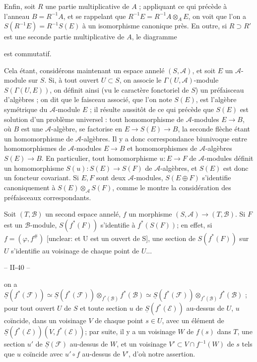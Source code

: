 Enfin, soit $R$ une partie multiplicative de $A$ ; appliquant ce qui précède à l'anneau $B=R^{-1}A$, et se rappelant que $R^{-1}E = R^{-1}A \otimes_A E$, on voit que l'on a $S(R^{-1}E) = R^{-1}S(E)$ à un isomorphisme canonique près. En outre, si $R \supset R'$ est une seconde partie multiplicative de $A$, le diagramme


est commutatif.

Cela étant, considérons maintenant un espace annelé $(S, \mathcal{A})$, et soit $E$ un $\mathcal{A}$-module sur $S$. Si, à tout ouvert $U \subset S$, on associe le $\Gamma(U, \mathcal{A})$-module $S(\Gamma(U, E))$, on définit ainsi (vu le caractère fonctoriel de $S$) un préfaisceau d'algèbres ; on dit que le faisceau associé, que l'on note $S(E)$, est l'algèbre symétrique du $\mathcal{A}$-module $E$ ; il résulte aussitôt de ce qui précède que $S(E)$ est solution d'un problème universel : tout homomorphisme de $\mathcal{A}$-modules $E \to B$, où $B$ est une $\mathcal{A}$-algèbre, se factorise en $E \to S(E) \to B$, la seconde flèche étant un homomorphisme de $\mathcal{A}$-algèbres. Il y a donc correspondance biunivoque entre homomorphismes de $\mathcal{A}$-modules $E \to B$ et homomorphismes de $\mathcal{A}$-algèbres $S(E) \to B$. En particulier, tout homomorphisme $u: E \to F$ de $\mathcal{A}$-modules définit un homomorphisme $S(u): S(E) \to S(F)$ de $\mathcal{A}$-algèbres, et $S(E)$ est donc un foncteur covariant. Si $E, F$ sont deux $\mathcal{A}$-modules, $S(E \oplus F)$ s'identifie canoniquement à $S(E) \otimes_{\mathcal{A}} S(F)$, comme le montre la considération des préfaisceaux correspondants.

Soit $(T, \mathcal{B})$ un second espace annelé, $f$ un morphisme $(S, \mathcal{A}) \to (T, \mathcal{B})$. Si $F$ est un $\mathcal{B}$-module, $S(f^*(F))$ s'identifie à $f^*(S(F))$; en effet, si $f=(\varphi, f^\#)$ [unclear: et U est un ouvert de S], une section de $S(f^*(F))$ sur $U$ s'identifie au voisinage de chaque point de $U$...

\newpage


-- II-40 --

on a $\underline{S}(f^*(\mathcal{F})) \simeq \underline{S}(f^*(\mathcal{F})) \otimes_{f^*(\mathcal{B})} f^*(\mathcal{B}) \simeq \underline{S}(\underline{f}^*(\mathcal{F})) \otimes_{f^*(\mathcal{B})} f^*(\mathcal{B})$ ; pour tout ouvert $U$ de $S$ et toute section $u$ de $\underline{S}(f^*(\mathcal{E}))$ au-dessus de $U$, $u$ coïncide, dans un voisinage $V$ de chaque point $s \in U$, avec un élément de $\underline{S}(f^*(\mathcal{E}))(V, f^*(\mathcal{E}))$; par suite, il y a un voisinage $W$ de $f(s)$ dans $T$, une section $u'$ de $\underline{S}(\mathcal{F})$ au-dessus de $W$, et un voisinage $V' \subset V \cap f^{-1}(W)$ de $s$ tels que $u$ coïncide avec $u' \circ f$ au-dessus de $V'$, d'où notre assertion.

